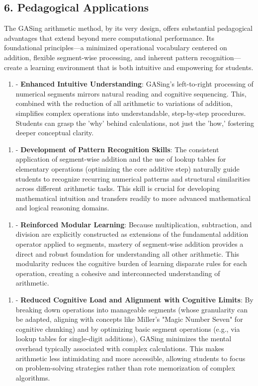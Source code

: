 \documentclass[11pt,a4paper]{article}
\begin{document}
\subsection{6. Pedagogical Applications}
The GASing arithmetic method, by its very design, offers substantial pedagogical advantages that extend beyond mere computational performance. Its foundational principles—a minimized operational vocabulary centered on addition, flexible segment-wise processing, and inherent pattern recognition—create a learning environment that is both intuitive and empowering for students.

\begin{enumerate}
  \item - \textbf{Enhanced Intuitive Understanding}: GASing's left-to-right processing of numerical segments mirrors natural reading and cognitive sequencing. This, combined with the reduction of all arithmetic to variations of addition, simplifies complex operations into understandable, step-by-step procedures. Students can grasp the 'why' behind calculations, not just the 'how,' fostering deeper conceptual clarity.
\end{enumerate}

\begin{enumerate}
  \item - \textbf{Development of Pattern Recognition Skills}: The consistent application of segment-wise addition and the use of lookup tables for elementary operations (optimizing the core additive step) naturally guide students to recognize recurring numerical patterns and structural similarities across different arithmetic tasks. This skill is crucial for developing mathematical intuition and transfers readily to more advanced mathematical and logical reasoning domains.
\end{enumerate}

\begin{enumerate}
  \item - \textbf{Reinforced Modular Learning}: Because multiplication, subtraction, and division are explicitly constructed as extensions of the fundamental addition operator applied to segments, mastery of segment-wise addition provides a direct and robust foundation for understanding all other arithmetic. This modularity reduces the cognitive burden of learning disparate rules for each operation, creating a cohesive and interconnected understanding of arithmetic.
\end{enumerate}

\begin{enumerate}
  \item - \textbf{Reduced Cognitive Load and Alignment with Cognitive Limits}: By breaking down operations into manageable segments (whose granularity can be adapted, aligning with concepts like Miller's "Magic Number Seven" for cognitive chunking) and by optimizing basic segment operations (e.g., via lookup tables for single-digit additions), GASing minimizes the mental overhead typically associated with complex calculations. This makes arithmetic less intimidating and more accessible, allowing students to focus on problem-solving strategies rather than rote memorization of complex algorithms.
\end{enumerate}
\end{document}
